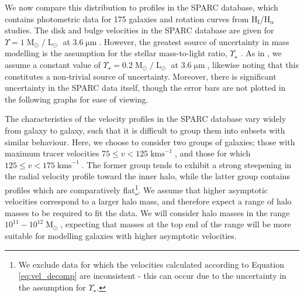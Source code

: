 \documentclass{pasa}%
\begin{document}
We now compare this distribution to profiles in the SPARC database, which contains photometric data for 175 galaxies and rotation curves from $\mathrm{H}_{\mathrm{I}}$/$\mathrm{H}_{\alpha}$ studies. The disk and bulge velocities in the SPARC database are given for $\Upsilon = 1 \operatorname{M}_{\odot}/\operatorname{L}_{\odot}$ at $3.6\operatorname{\mu m}$. However, the greatest source of uncertainty in mass modelling is the assumption for the stellar mass-to-light ratio, $\Upsilon_\star$ \cite{Lelli:2016zqa}. As in \cite{Robles:2018fur}, we  assume a constant value of $\Upsilon_\star = 0.2 \operatorname{M}_{\odot}/\operatorname{L}_{\odot}$ at $3.6\operatorname{\mu m}$, likewise noting that  this constitutes a non-trivial source of uncertainty. Moreover, there is significant uncertainty in the SPARC data itself, though the error bars are not plotted in the following graphs for ease of viewing. 

The characteristics of the velocity profiles in the SPARC database vary widely from galaxy to galaxy, such that it is difficult to group them into subsets with similar behaviour. Here, we choose to consider two groups of galaxies; those with maximum tracer velocities $75 \leq v < 125\operatorname{kms}^{-1}$, and those for which $125 \leq v < 175\operatorname{kms}^{-1}$. The former group tends to exhibit a strong steepening in the radial velocity profile toward the inner halo, while the latter  group contains profiles which are comparatively flat\footnote{We exclude data for which the velocities calculated according to Equation \ref{eq:vel_decomp} are inconsistent - this can occur due to the uncertainty in the assumption for $\Upsilon_\star$.}. We assume that higher asymptotic velocities correspond to a larger halo mass, and therefore expect a range of halo masses to be required to fit the data. We will consider halo masses in the range $10^{11} - 10^{12} \operatorname{M}_{\odot}$, expecting that masses at the top end of the range will be more suitable for modelling galaxies with higher asymptotic velocities. 
\end{document}
